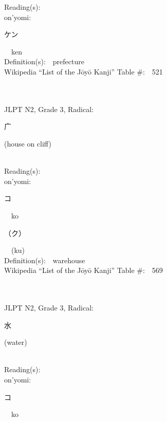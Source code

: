 \begin{multicols}{2}
Reading(s):\ \ \\
{\hspace*{1em}}on'yomi:\ \ \\
{\hspace*{2em}}{\begin{CJK}{UTF8}{min} ケン \end{CJK}}\ \ ken\ \ \\
Definition(s):\ \ prefecture \\
Wikipedia ``List of the J\=oy\=o Kanji'' Table \#:\ \ 521 \\
\ \ \\
{\fontsize{34pt}{40pt}  }\ \ \\  %
{JLPT N2, Grade 3, Radical:\ \ {\begin{CJK}{UTF8}{min} 广 \end{CJK}} (house on cliff) } \\
Reading(s):\ \ \\
{\hspace*{1em}}on'yomi:\ \ \\
{\hspace*{2em}}{\begin{CJK}{UTF8}{min} コ \end{CJK}}\ \ ko\ \ \\
{\hspace*{2em}}{\begin{CJK}{UTF8}{min} （ク） \end{CJK}}\ \ (ku)\ \ \\
Definition(s):\ \ warehouse \\
Wikipedia ``List of the J\=oy\=o Kanji'' Table \#:\ \ 569 \\
\ \ \\
{\fontsize{34pt}{40pt}  }\ \ \\  %
{JLPT N2, Grade 3, Radical:\ \ {\begin{CJK}{UTF8}{min} 水 \end{CJK}} (water) } \\
Reading(s):\ \ \\
{\hspace*{1em}}on'yomi:\ \ \\
{\hspace*{2em}}{\begin{CJK}{UTF8}{min} コ \end{CJK}}\ \ ko\ \ \\

\end{multicols}
